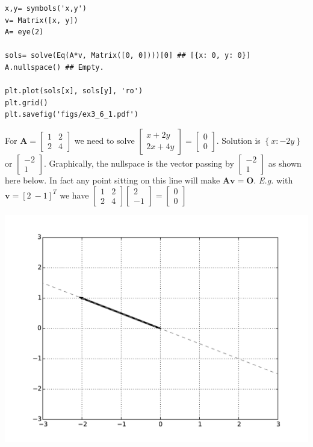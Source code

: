 \begin{verbatim}
x,y= symbols('x,y')
v= Matrix([x, y])
A= eye(2)

sols= solve(Eq(A*v, Matrix([0, 0])))[0] ## [{x: 0, y: 0}]
A.nullspace() ## Empty. 

plt.plot(sols[x], sols[y], 'ro')
plt.grid()
plt.savefig('figs/ex3_6_1.pdf')
\end{verbatim}

For $\mathbf{A}= \left[\begin{matrix}1 & 2\\2 & 4\end{matrix}\right]$ we need to
solve $\left[\begin{matrix}x + 2 y\\2 x + 4 y\end{matrix}\right] = \left[\begin{matrix}0\\0\end{matrix}\right]$.
Solution is $\left \{ x : - 2 y\right \}$ or $\left[\begin{matrix}-2\\1\end{matrix}\right]$.
Graphically, the nullspace is the vector passing by $\left[\begin{matrix}-2\\1\end{matrix}\right]$
as shown here below. In fact any point sitting on this line will make $\mathbf{Av = O}$.
\emph{E.g.} with $\mathbf{v} = [2\ -1]^T$ we have $\left[\begin{matrix}1 & 2\\2 & 4\end{matrix}\right] \left[\begin{matrix}2\\-1\end{matrix}\right] =
\left[\begin{matrix}0\\0\end{matrix}\right]$

\includegraphics[width=0.7\linewidth]{figs/ex3_6_1b.pdf}

